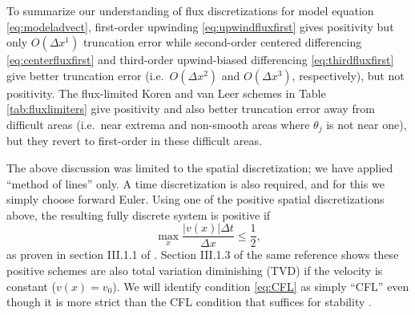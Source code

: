 \documentclass[11pt,final]{amsart}%
\begin{document}
To summarize our understanding of flux discretizations for model equation \eqref{eq:modeladvect}, first-order upwinding \eqref{eq:upwindfluxfirst} gives positivity but only $O(\Delta x^1)$ truncation error while second-order centered differencing \eqref{eq:centerfluxfirst} and third-order upwind-biased differencing \eqref{eq:thirdfluxfirst} give better truncation error (i.e.~$O(\Delta x^2)$ and $O(\Delta x^3)$, respectively), but not positivity.  The flux-limited Koren and van Leer schemes in Table \ref{tab:fluxlimiters} give positivity and also better truncation error away from difficult areas (i.e.~near extrema and non-smooth areas where $\theta_j$ is not near one), but they revert to first-order in these difficult areas.

The above discussion was limited to the spatial discretization; we have applied ``method of lines'' only.  A time discretization is also required, and for this we simply choose forward Euler.  Using one of the positive spatial discretizations above, the resulting fully discrete system is positive if
\begin{equation}
\max_x \frac{|v(x)|\Delta t}{\Delta x} \le \frac{1}{2}, \label{eq:CFL}
\end{equation}
as proven in section III.1.1 of \cite{HundsdorferVerwer2010}.  Section III.1.3 of the same reference shows these positive schemes are also total variation diminishing (TVD) if the velocity is constant ($v(x)=v_0$).  We will identify condition \eqref{eq:CFL} as simply ``CFL'' even though it is more strict than the CFL condition that suffices for stability \citep{MortonMayers}.
\end{document}
